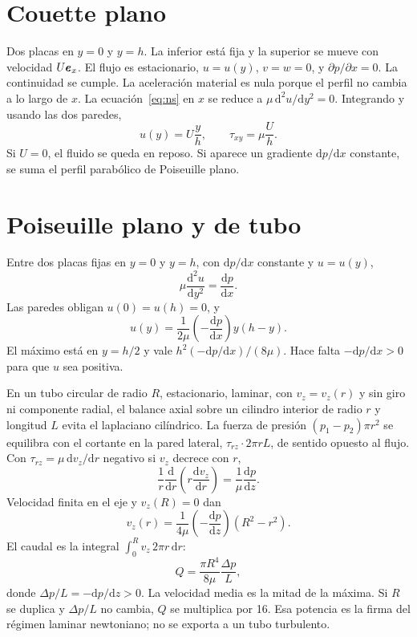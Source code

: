 \section{Couette plano}

Dos placas en \(y=0\) y \(y=h\). La inferior está fija y la superior se mueve con velocidad \(U\boldsymbol{e}_x\). El flujo es estacionario, \(u=u(y)\), \(v=w=0\), y \(\partial p/\partial x=0\). La continuidad se cumple. La aceleración material es nula porque el perfil no cambia a lo largo de \(x\). La ecuación~\eqref{eq:ns} en \(x\) se reduce a \(\mu\,\mathrm{d}^2u/\mathrm{d}y^2=0\). Integrando y usando las dos paredes,
\begin{equation}
\label{eq:couette}
u(y)=U\frac{y}{h},
\qquad
\tau_{xy}=\mu\frac{U}{h}.
\end{equation}
 Si \(U=0\), el fluido se queda en reposo. Si aparece un gradiente \(\mathrm{d}p/\mathrm{d}x\) constante, se suma el perfil parabólico de Poiseuille plano.

\section{Poiseuille plano y de tubo}

Entre dos placas fijas en \(y=0\) y \(y=h\), con \(\mathrm{d}p/\mathrm{d}x\) constante y \(u=u(y)\),
\[
\mu\frac{\mathrm{d}^2u}{\mathrm{d}y^2}=\frac{\mathrm{d}p}{\mathrm{d}x}.
\]
Las paredes obligan \(u(0)=u(h)=0\), y
\begin{equation}
\label{eq:poiseuille-plano}
u(y)=\frac{1}{2\mu}\left(-\frac{\mathrm{d}p}{\mathrm{d}x}\right)y(h-y).
\end{equation}
El máximo está en \(y=h/2\) y vale \(h^2(-\mathrm{d}p/\mathrm{d}x)/(8\mu)\). Hace falta \(-\mathrm{d}p/\mathrm{d}x>0\) para que \(u\) sea positiva.

En un tubo circular de radio \(R\), estacionario, laminar, con \(v_z=v_z(r)\) y sin giro ni componente radial, el balance axial sobre un cilindro interior de radio \(r\) y longitud \(L\) evita el laplaciano cilíndrico. La fuerza de presión \((p_1-p_2)\pi r^2\) se equilibra con el cortante en la pared lateral, \(\tau_{rz}\cdot 2\pi r L\), de sentido opuesto al flujo. Con \(\tau_{rz}=\mu\,\mathrm{d}v_z/\mathrm{d}r\) negativo si \(v_z\) decrece con \(r\),
\[
\frac{1}{r}\frac{\mathrm{d}}{\mathrm{d}r}\left(r\frac{\mathrm{d}v_z}{\mathrm{d}r}\right)=\frac{1}{\mu}\frac{\mathrm{d}p}{\mathrm{d}z}.
\]
Velocidad finita en el eje y \(v_z(R)=0\) dan
\begin{equation}
\label{eq:poiseuille}
v_z(r)=\frac{1}{4\mu}\left(-\frac{\mathrm{d}p}{\mathrm{d}z}\right)(R^2-r^2).
\end{equation}
El caudal es la integral \( \int_0^R v_z\,2\pi r\,\mathrm{d}r \):
\begin{equation}
\label{eq:caudal-poiseuille}
Q=\frac{\pi R^4}{8\mu}\frac{\Delta p}{L},
\end{equation}
donde \(\Delta p/L=-\mathrm{d}p/\mathrm{d}z>0\). La velocidad media es la mitad de la máxima. Si \(R\) se duplica y \(\Delta p/L\) no cambia, \(Q\) se multiplica por 16. Esa potencia es la firma del régimen laminar newtoniano; no se exporta a un tubo turbulento.

